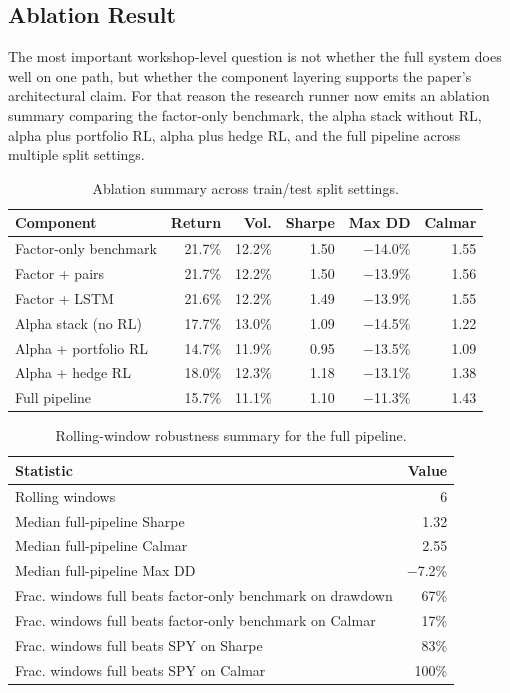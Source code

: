 \documentclass[11pt]{article}
\begin{document}
\subsection{Ablation Result}

The most important workshop-level question is not whether the full system does
well on one path, but whether the component layering supports the paper's
architectural claim. For that reason the research runner now emits an ablation
summary comparing the factor-only benchmark, the alpha stack without RL, alpha
plus portfolio RL, alpha plus hedge RL, and the full pipeline across multiple
split settings.

\begin{table}[H]
\centering
\caption{Ablation summary across train/test split settings.}
\label{tab:ablation_summary}
\begingroup\small
\begin{tabular}{@{} l r r r r r @{}}
\toprule
\textbf{Component} & \textbf{Return} & \textbf{Vol.} & \textbf{Sharpe} & \textbf{Max DD} & \textbf{Calmar} \\
\midrule
Factor-only benchmark & 21.7\% & 12.2\% & 1.50 & $-$14.0\% & 1.55 \\
Factor + pairs        & 21.7\% & 12.2\% & 1.50 & $-$13.9\% & 1.56 \\
Factor + LSTM         & 21.6\% & 12.2\% & 1.49 & $-$13.9\% & 1.55 \\
Alpha stack (no RL)   & 17.7\% & 13.0\% & 1.09 & $-$14.5\% & 1.22 \\
Alpha + portfolio RL  & 14.7\% & 11.9\% & 0.95 & $-$13.5\% & 1.09 \\
Alpha + hedge RL      & 18.0\% & 12.3\% & 1.18 & $-$13.1\% & 1.38 \\
Full pipeline         & 15.7\% & 11.1\% & 1.10 & $-$11.3\% & 1.43 \\
\bottomrule
\end{tabular}
\endgroup
\end{table}

\begin{table}[H]
\centering
\caption{Rolling-window robustness summary for the full pipeline.}
\label{tab:robustness_summary}
\begin{tabular}{@{} l r @{}}
\toprule
\textbf{Statistic} & \textbf{Value} \\
\midrule
Rolling windows                                    & 6 \\
Median full-pipeline Sharpe                        & 1.32 \\
Median full-pipeline Calmar                        & 2.55 \\
Median full-pipeline Max DD                        & $-$7.2\% \\
Frac. windows full beats factor-only benchmark on drawdown & 67\% \\
Frac. windows full beats factor-only benchmark on Calmar   & 17\% \\
Frac. windows full beats SPY on Sharpe             & 83\% \\
Frac. windows full beats SPY on Calmar             & 100\% \\
\bottomrule
\end{tabular}
\end{table}
\end{document}

